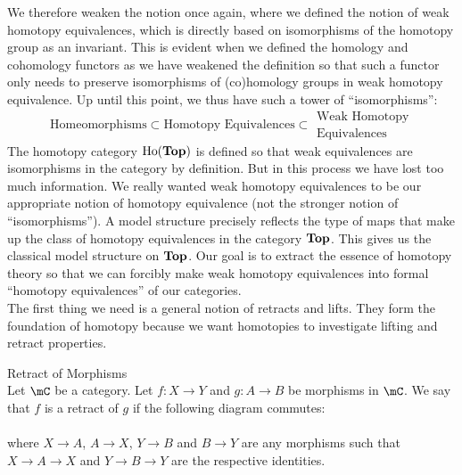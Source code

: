 \documentclass[a4paper]{article}
\begin{document}
We therefore weaken the notion once again, where we defined the notion of weak homotopy equivalences, which is directly based on isomorphisms of the homotopy group as an invariant. This is evident when we defined the homology and cohomology functors as we have weakened the definition so that such a functor only needs to preserve isomorphisms of (co)homology groups in weak homotopy equivalence. Up until this point, we thus have such a tower of ``isomorphisms'': $$\text{Homeomorphisms}\subset\text{Homotopy Equivalences}\subset\substack{\text{Weak Homotopy}\\\text{Equivalences}}$$ The homotopy category $\text{Ho}(\bold{Top})$ is defined so that weak equivalences are isomorphisms in the category by definition. But in this process we have lost too much information. We really wanted weak homotopy equivalences to be our appropriate notion of homotopy equivalence (not the stronger notion of ``isomorphisms''). A model structure precisely reflects the type of maps that make up the class of homotopy equivalences in the category $\bold{Top}$. This gives us the classical model structure on $\bold{Top}$. Our goal is to extract the essence of homotopy theory so that we can forcibly make weak homotopy equivalences into formal ``homotopy equivalences'' of our categories. \\

The first thing we need is a general notion of retracts and lifts. They form the foundation of homotopy because we want homotopies to investigate lifting and retract properties. 

\begin{defn}{Retract of Morphisms}{}\\ Let $\mC$ be a category. Let $f:X\to Y$ and $g:A\to B$ be morphisms in $\mC$. We say that $f$ is a retract of $g$ if the following diagram commutes: \\
\\
where $X\to A$, $A\to X$, $Y\to B$ and $B\to Y$ are any morphisms such that $X\to A\to X$ and $Y\to B\to Y$ are the respective identities. 
\end{defn}
\end{document}
